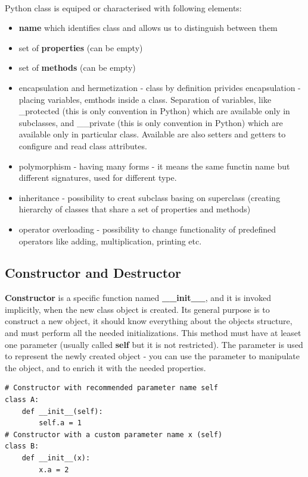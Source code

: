 \documentclass{article}
\begin{document}
\paragraph{}
Python class is equiped or characterised with following elements:
\begin{itemize}
\item \textbf{name} which identifies class and allows us to distinguish between them
\item set of \textbf{properties} (can be empty)
\item set of \textbf{methods} (can be empty)
\item encapsulation and hermetization - class by definition privides encapsulation - placing variables, emthods inside a class. Separation of variables, like \_protected (this is only convention in Python) which are available only in subclasses, and \_\_private (this is only convention in Python) which are available only in particular class. Available are also setters and getters to configure and read class attributes.
\item polymorphism - having many forms - it means the same functin name but different signatures, used for different type.
\item inheritance - possibility to creat subclass basing on superclass (creating hierarchy of classes that share a set of properties and methods)
\item operator overloading - possibility to change functionality of predefined operators like adding, multiplication, printing etc.
\end{itemize}

\subsection{Constructor and Destructor}
\textbf{Constructor} is a specific function named \textbf{\_\_init\_\_}, and it is invoked implicitly, when the new class object is created. Its general purpose is to construct a new object, it should know everything about the objects structure, and must perform all the needed initializations. This method must have at leaset one parameter (usually called \textbf{self} but it is not restricted). The parameter is used to represent the newly created object - you can use the parameter to manipulate the object, and to enrich it with the needed properties.
\begin{lstlisting}[style=pystyle]
# Constructor with recommended parameter name self
class A:
	def __init__(self):
		self.a = 1
# Constructor with a custom parameter name x (self)
class B:
	def __init__(x):
		x.a = 2
\end{lstlisting}
\end{document}
